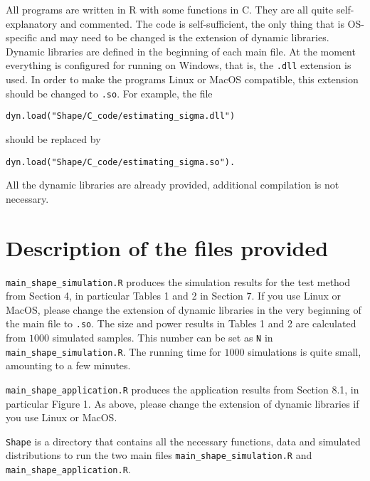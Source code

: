 \documentclass[a4paper,12pt]{article}
\begin{document}
All programs are written in R with some functions in C. They are all quite self-explanatory and commented. The code is self-sufficient, the only thing that is OS-specific and may need to be changed is the extension of dynamic libraries. Dynamic libraries are defined in the beginning of each main file. At the moment everything is configured for running on Windows, that is, the \verb|.dll| extension is used. In order to make the programs Linux or MacOS compatible, this extension should be changed to \verb|.so|. For example, the file
\begin{verbatim}
dyn.load("Shape/C_code/estimating_sigma.dll")
\end{verbatim} should be replaced by
\begin{verbatim}
dyn.load("Shape/C_code/estimating_sigma.so").
\end{verbatim}
All the dynamic libraries are already provided, additional  compilation is not necessary.



\newpage
\section*{Description of the files provided}


\setlength{\parskip}{0.3cm}
\everypar{\hangafter=1\hangindent=1.45cm\relax}

\verb|main_shape_simulation.R| \hspace{1pt} produces the simulation results for the test method from Section 4, in particular Tables 1 and 2 in Section 7. If you use Linux or MacOS, please change the extension of dynamic libraries in the very beginning of the main file to \verb|.so|. The size and power results in Tables 1 and 2 are calculated from $1000$ simulated samples. This number can be set as \verb|N| in \verb|main_shape_simulation.R|. The running time for $1000$ simulations is quite small, amounting to a few minutes. 

\verb|main_shape_application.R| \hspace{1pt} produces the application results from Section 8.1, in particular Figure 1. As above, please change the extension of dynamic libraries if you use Linux or MacOS.

\verb|Shape| \hspace{1pt} is a directory that contains all the necessary functions, data and simulated distributions to run the two main files \verb|main_shape_simulation.R| and \verb|main_shape_application.R|.
\end{document}
